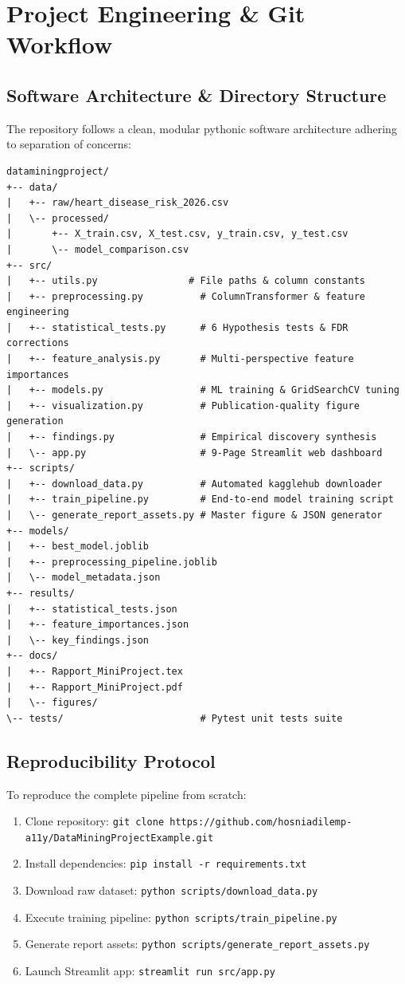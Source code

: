\chapter{Project Engineering \& Git Workflow}

\section{Software Architecture \& Directory Structure}
The repository follows a clean, modular pythonic software architecture adhering to separation of concerns:

\begin{verbatim}
dataminingproject/
+-- data/
|   +-- raw/heart_disease_risk_2026.csv
|   \-- processed/
|       +-- X_train.csv, X_test.csv, y_train.csv, y_test.csv
|       \-- model_comparison.csv
+-- src/
|   +-- utils.py                # File paths & column constants
|   +-- preprocessing.py          # ColumnTransformer & feature engineering
|   +-- statistical_tests.py      # 6 Hypothesis tests & FDR corrections
|   +-- feature_analysis.py       # Multi-perspective feature importances
|   +-- models.py                 # ML training & GridSearchCV tuning
|   +-- visualization.py          # Publication-quality figure generation
|   +-- findings.py               # Empirical discovery synthesis
|   \-- app.py                    # 9-Page Streamlit web dashboard
+-- scripts/
|   +-- download_data.py          # Automated kagglehub downloader
|   +-- train_pipeline.py         # End-to-end model training script
|   \-- generate_report_assets.py # Master figure & JSON generator
+-- models/
|   +-- best_model.joblib
|   +-- preprocessing_pipeline.joblib
|   \-- model_metadata.json
+-- results/
|   +-- statistical_tests.json
|   +-- feature_importances.json
|   \-- key_findings.json
+-- docs/
|   +-- Rapport_MiniProject.tex
|   +-- Rapport_MiniProject.pdf
|   \-- figures/
\-- tests/                        # Pytest unit tests suite
\end{verbatim}

\section{Reproducibility Protocol}
To reproduce the complete pipeline from scratch:
\begin{enumerate}
    \item Clone repository: \texttt{git clone https://github.com/hosniadilemp-a11y/DataMiningProjectExample.git}
    \item Install dependencies: \texttt{pip install -r requirements.txt}
    \item Download raw dataset: \texttt{python scripts/download\_data.py}
    \item Execute training pipeline: \texttt{python scripts/train\_pipeline.py}
    \item Generate report assets: \texttt{python scripts/generate\_report\_assets.py}
    \item Launch Streamlit app: \texttt{streamlit run src/app.py}
\end{enumerate}

